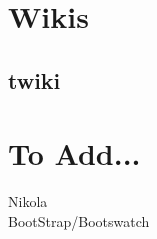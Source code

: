 \documentclass{article}
\begin{document}
\section{Wikis}
\subsection{twiki}


\section{To Add...}
Nikola                          \\ %
BootStrap/Bootswatch      %
\end{document}
